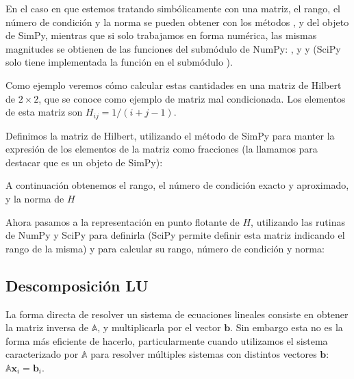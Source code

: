 En el caso en que estemos tratando simbólicamente con una matriz, el rango, el número de condición y la norma se pueden obtener con los métodos ,  y  del objeto  de SimPy, mientras que si solo trabajamos en forma numérica, las mismas magnitudes se obtienen de las funciones del submódulo  de NumPy: , y  y  (SciPy solo tiene implementada la función  en el submódulo ).

Como ejemplo veremos cómo calcular estas cantidades en una matriz de Hilbert de $2 \times 2$, que se conoce como ejemplo de matriz mal condicionada. Los elementos de esta matriz son $H_{ij} = 1 / (i+j-1)$. 

Definimos la matriz de Hilbert, utilizando el método  de SimPy para manter la expresión de los elementos de la matriz como fracciones (la llamamos  para destacar que es un objeto  de SimPy):

A continuación obtenemos el rango, el número de condición exacto y aproximado, y la norma de $H$

Ahora pasamos a la representación en punto flotante de $H$, utilizando las rutinas de NumPy y SciPy para definirla (SciPy permite definir esta matriz indicando el rango de la misma) y para calcular su rango, número de condición y norma:

\subsection{Descomposición LU}

La forma directa de resolver un sistema de ecuaciones lineales consiste en obtener la matriz inversa de $\mathbb{A}$, y multiplicarla por el vector $\bm{b}$. Sin embargo esta no es la forma más eficiente de hacerlo, particularmente cuando utilizamos el sistema caracterizado por $\mathbb{A}$ para resolver múltiples sistemas con distintos vectores $\bm{b}$:  $\mathbb{A} \bm{x}_i = \bm{b}_i$. 

